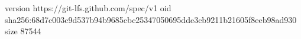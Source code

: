 version https://git-lfs.github.com/spec/v1
oid sha256:68d7c003c9d537b94b9685cbc25347050695dde3cb9211b21605f8eeb98ad930
size 87544
